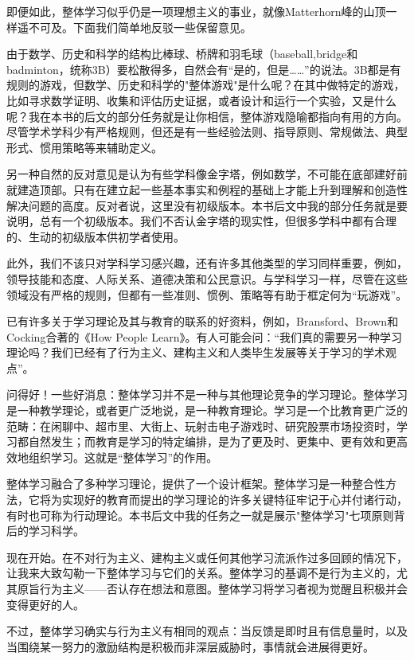即便如此，整体学习似乎仍是一项理想主义的事业，就像Matterhorn峰的山顶一样遥不可及。下面我们简单地反驳一些保留意见。

由于数学、历史和科学的结构比棒球、桥牌和羽毛球（baseball,bridge和badminton，统称3B）要松散得多，自然会有“是的，但是……”的说法。3B都是有规则的游戏，但数学、历史和科学的"整体游戏"是什么呢？在其中做特定的游戏，比如寻求数学证明、收集和评估历史证据，或者设计和运行一个实验，又是什么呢？我在本书的后文的部分任务就是让你相信，整体游戏隐喻都指向有用的方向。尽管学术学科少有严格规则，但还是有一些经验法则、指导原则、常规做法、典型形式、惯用策略等来辅助定义。

另一种自然的反对意见是认为有些学科像金字塔，例如数学，不可能在底部建好前就建造顶部。只有在建立起一些基本事实和例程的基础上才能上升到理解和创造性解决问题的高度。反对者说，这里没有初级版本。本书后文中我的部分任务就是要说明，总有一个初级版本。我们不否认金字塔的现实性，但很多学科中都有合理的、生动的初级版本供初学者使用。

此外，我们不该只对学科学习感兴趣，还有许多其他类型的学习同样重要，例如，领导技能和态度、人际关系、道德决策和公民意识。与学科学习一样，尽管在这些领域没有严格的规则，但都有一些准则、惯例、策略等有助于框定何为“玩游戏”。

已有许多关于学习理论及其与教育的联系的好资料，例如，Bransford、Brown和Cocking合著的《How People Learn》。有人可能会问：“我们真的需要另一种学习理论吗？我们已经有了行为主义、建构主义和人类毕生发展等关于学习的学术观点”。

问得好！一些好消息：整体学习并不是一种与其他理论竞争的学习理论。整体学习是一种教学理论，或者更广泛地说，是一种教育理论。学习是一个比教育更广泛的范畴：在闲聊中、超市里、大街上、玩射击电子游戏时、研究股票市场投资时，学习都自然发生；而教育是学习的特定编排，是为了更及时、更集中、更有效和更高效地组织学习。这就是“整体学习”的作用。

整体学习融合了多种学习理论，提供了一个设计框架。整体学习是一种整合性方法，它将为实现好的教育而提出的学习理论的许多关键特征牢记于心并付诸行动，有时也可称为行动理论。本书后文中我的任务之一就是展示"整体学习"七项原则背后的学习科学。

现在开始。在不对行为主义、建构主义或任何其他学习流派作过多回顾的情况下，让我来大致勾勒一下整体学习与它们的关系。整体学习的基调不是行为主义的，尤其原旨行为主义——否认存在想法和意图。整体学习将学习者视为觉醒且积极并会变得更好的人。

不过，整体学习确实与行为主义有相同的观点：当反馈是即时且有信息量时，以及当围绕某一努力的激励结构是积极而非深层威胁时，事情就会进展得更好。

